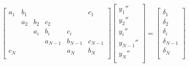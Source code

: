 \documentclass[aps,onecolumn,11pt]{revtex4}
\begin{document}
\begin{equation}
\begin{bmatrix}
a_1  & b_1 &     &         &         &  c_1    \\
     & a_2 & b_2 & c_2     &         &         \\
     &     & a_i & b_i     & c_i     &         \\
     &     &     & a_{N-1} & b_{N-1} & c_{N-1} \\
 c_N &     &     &         &   a_N   & b_N     \\
\end{bmatrix}
\begin{bmatrix}
	y_1''\\
	y_2''\\
	y_i''\\
	y_{N-1}''\\
	y_N''\\
\end{bmatrix}
 = 
 \begin{bmatrix}
 	\delta_1\\
	\delta_2\\
	\delta_i\\
	\delta_{N-1}\\
	\delta_N\\
 \end{bmatrix}
\end{equation}
	
\end{document}
